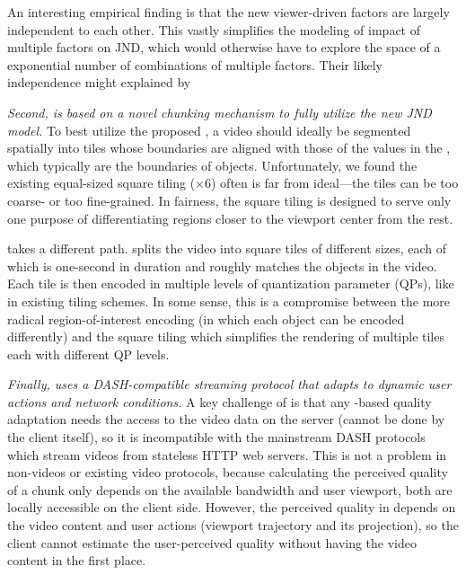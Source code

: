An interesting empirical finding is that the new viewer-driven factors are largely independent to each other.
This vastly simplifies the modeling of impact of multiple factors on JND, which would otherwise have to explore the space of a exponential number of combinations of multiple factors.
Their likely independence might explained by 


\vspace{0.2cm}
{\em Second, \name is based on a novel chunking mechanism to fully utilize the new JND model.}
To best utilize the proposed \vrjnd,  a video should ideally be segmented spatially into tiles whose boundaries are aligned with those of the values in the \vrjnd, which typically are the boundaries of objects.
Unfortunately, we found the existing equal-sized square tiling ($\times$6) often is far from ideal---the tiles can be too coarse- or too fine-grained. 
In fairness, the square tiling is designed to serve only one purpose of differentiating regions closer to the viewport center from the rest.

\name takes a different path. 
\name splits the \vr video into square tiles of different sizes, each of which is one-second in duration and roughly matches the objects in the video. Each tile is then encoded in multiple levels of quantization parameter (QPs), like in existing tiling schemes.
In some sense, this is a compromise between the more radical region-of-interest encoding (in which each object can be encoded differently) and the square tiling which simplifies the rendering of multiple tiles each with different QP levels.



\vspace{0.2cm}
{\em Finally, \name uses a DASH-compatible streaming protocol that adapts to dynamic user actions and network conditions.}
A key challenge of \vrjnd is that any \vrjnd-based quality adaptation needs the access to the video data on the server (\ie cannot be done by the client itself), so it is incompatible with the mainstream DASH protocols which stream videos from stateless HTTP web servers. 
This is not a problem in non-\vr videos or existing \vr video protocols, because calculating the perceived quality of a chunk only depends on the available bandwidth and user viewport, both are locally accessible on the client side.
However, the perceived quality in \vrjnd depends on the video content and user actions (\ie viewport trajectory and its projection), so the client cannot estimate the user-perceived quality without having the video content in the first place. 


